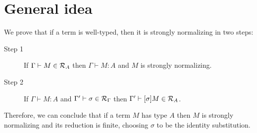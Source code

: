 




\section{General idea}

We prove that if a term is well-typed, then it is strongly normalizing in  two steps:

\begin{description}
\item[Step 1] If $\Gamma \vdash M \in \mathcal{R}_{A}$ then $\Gamma \vdash M : A$ and $M$ is strongly normalizing.
\item[Step 2] If $\Gamma \vdash M : A$ and $\Gamma' \vdash \sigma \in \mathcal{R}_{\Gamma}$ then $\Gamma' \vdash [\sigma]M \in \mathcal{R}_{A}$.
\end{description}

Therefore, we can conclude that if a term $M$ has type $A$ then $M$ is strongly normalizing and its reduction is finite, choosing $\sigma$ to be the identity substitution.



